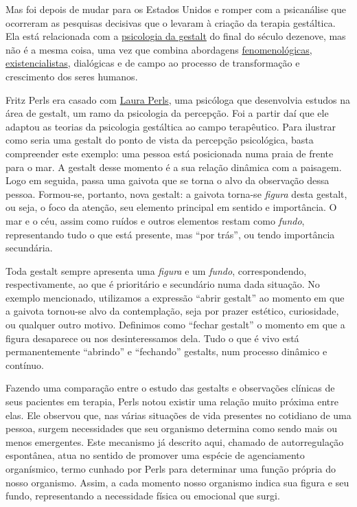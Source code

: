 Mas foi depois de mudar para os Estados Unidos e romper com a
psicanálise que ocorreram as pesquisas decisivas que o levaram à criação
da terapia gestáltica. Ela está relacionada com a
\href{http://pt.wikipedia.org/wiki/Psicologia_gestalt}{psicologia da
gestalt} do final do século dezenove, mas não é a mesma coisa, uma vez
que combina abordagens
\href{http://pt.wikipedia.org/wiki/Fenomenologia}{fenomenológicas},
\href{http://pt.wikipedia.org/wiki/Existencialismo}{existencialistas},
dialógicas e de campo ao processo de transformação e crescimento dos
seres humanos.

Fritz Perls era casado com
\href{http://pt.wikipedia.org/w/index.php?title=Laura_Perls\&action=edit\&redlink=1}{Laura
Perls}, uma psicóloga que desenvolvia estudos na área de gestalt, um
ramo da psicologia da percepção. Foi a partir daí que ele adaptou as
teorias da psicologia gestáltica ao campo terapêutico. Para ilustrar
como seria uma gestalt do ponto de vista da percepção psicológica, basta
compreender este exemplo: uma pessoa está posicionada numa praia de
frente para o mar. A gestalt desse momento é a sua relação dinâmica com
a paisagem. Logo em seguida, passa uma gaivota que se torna o alvo da
observação dessa pessoa. Formou-se, portanto, nova gestalt: a gaivota
torna-se \emph{figura} desta gestalt, ou seja, o foco da atenção, seu
elemento principal em sentido e importância. O mar e o céu, assim como
ruídos e outros elementos restam como \emph{fundo}, representando tudo o
que está presente, mas ``por trás'', ou tendo importância secundária.

Toda gestalt sempre apresenta uma \emph{figura} e um \emph{fundo},
correspondendo, respectivamente, ao que é prioritário e secundário numa
dada situação. No exemplo mencionado, utilizamos a expressão ``abrir
gestalt'' ao momento em que a gaivota tornou-se alvo da contemplação,
seja por prazer estético, curiosidade, ou qualquer outro motivo.
Definimos como ``fechar gestalt'' o momento em que a figura desaparece
ou nos desinteressamos dela. Tudo o que é vivo está permanentemente
``abrindo'' e ``fechando'' gestalts, num processo dinâmico e contínuo.

Fazendo uma comparação entre o estudo das gestalts e observações
clínicas de seus pacientes em terapia, Perls notou existir uma relação
muito próxima entre elas. Ele observou que, nas várias situações de vida
presentes no cotidiano de uma pessoa, surgem necessidades que seu
organismo determina como sendo mais ou menos emergentes. Este mecanismo
já descrito aqui, chamado de autorregulação espontânea, atua no sentido
de promover uma espécie de agenciamento organísmico, termo cunhado por
Perls para determinar uma função própria do nosso organismo. Assim, a
cada momento nosso organismo indica sua figura e seu fundo,
representando a necessidade física ou emocional que surgi.

